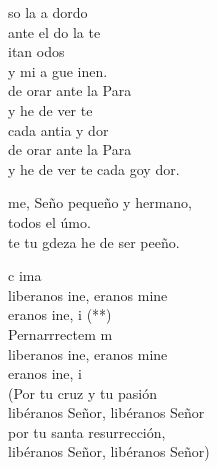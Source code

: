 \documentclass[12pt]{article}
\begin{document}
\begin{multicols*}{2}
\begin{cancion}%
	so la a dordo \\
	ante el do  la te\\
	itan  odos\\
	y mi a gue inen.\\
	 de orar ante la Para \\
	y he de ver te \\
	cada antia y dor\\
	 de orar ante la Para\\
	y he de ver te cada goy dor.\\
\end{cancion}%

\begin{cancion}%
	me, Seño pequeño y hermano,\\
	 todos el úmo.\\
	te tu gdeza he de ser peeño.\\
\end{cancion}%

\begin{cancion}%
	 c  ima\\
	liberanos ine, eranos mine\\
	eranos ine, i (**)\\
	Pernarrrectem m\\
	liberanos ine, eranos mine\\
	eranos ine, i\\
(Por tu cruz y tu pasión\\
 libéranos Señor, libéranos Señor\\
 por tu santa resurrección,\\
 libéranos Señor, libéranos Señor)\\
\end{cancion}%


\end{multicols*}
\end{document}
